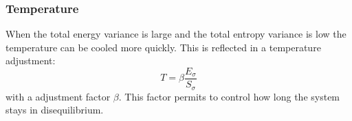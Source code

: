 \subsubsection{Temperature}
When the total energy variance is large and the total entropy variance is low
the temperature can be cooled more quickly. This is reflected in a temperature
adjustment:
\begin{equation}\label{eq:tempadj}
T = \beta\frac{E_\sigma}{S_\sigma}
\end{equation}
with a adjustment factor $\beta$. This factor permits to control how long the
system stays in disequilibrium. 



